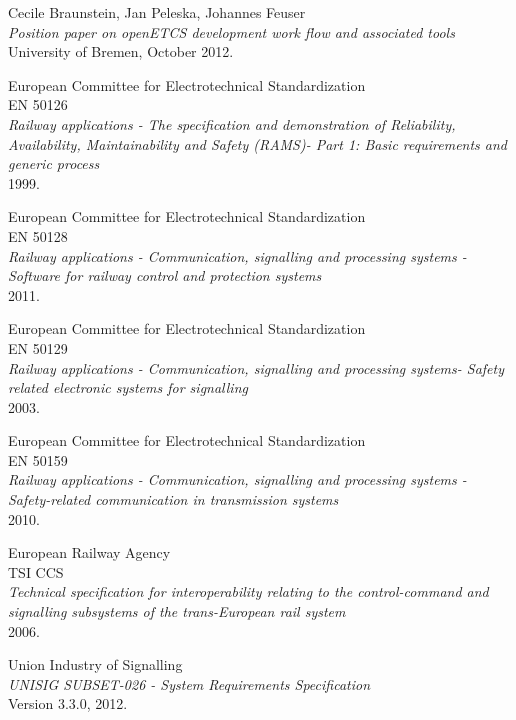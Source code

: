 \documentclass{template/openetcs_report}
\begin{document}
\begin{thebibliography}{99}

  Cecile Braunstein, Jan Peleska, Johannes Feuser\\
  \emph{Position paper on openETCS development work flow and associated tools}\\
  University of Bremen,
  October 2012.

  European Committee for Electrotechnical Standardization\\EN 50126\\
  \emph{Railway applications - The specification and demonstration of Reliability, Availability, Maintainability and Safety (RAMS)- Part 1: Basic requirements and generic process}\\
  1999.

  European Committee for Electrotechnical Standardization\\EN 50128\\
  \emph{Railway applications - Communication, signalling and processing systems - Software for railway control and protection systems}\\
  2011.

  European Committee for Electrotechnical Standardization\\EN 50129\\
  \emph{Railway applications - Communication, signalling and processing systems- Safety related electronic systems for signalling}\\
  2003.

  European Committee for Electrotechnical Standardization\\EN 50159\\
  \emph{Railway applications - Communication, signalling and processing systems - Safety-related communication in transmission systems}\\
  2010.

  European Railway Agency\\TSI CCS\\
  \emph{Technical specification for interoperability relating to the control-command and signalling subsystems of the trans-European rail system}\\
  2006.

  Union Industry of Signalling\\
  \emph{ UNISIG SUBSET-026 - System Requirements Specification}\\
  Version 3.3.0,
  2012.



\end{thebibliography}
\end{document}
